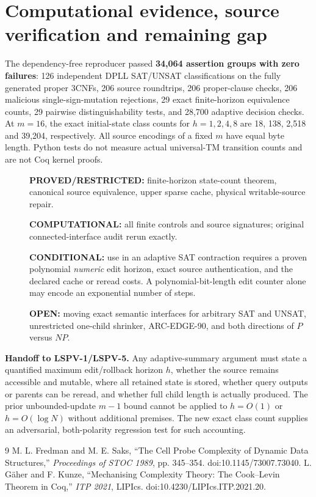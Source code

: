\documentclass[11pt]{article}
\begin{document}
\section{Computational evidence, source verification and remaining gap}
The dependency-free reproducer passed \textbf{34,064 assertion groups with zero failures}: 126 independent DPLL SAT/UNSAT classifications on the fully generated proper 3CNFs, 206 source roundtrips, 206 proper-clause checks, 206 malicious single-sign-mutation rejections, 29 exact finite-horizon equivalence counts, 29 pairwise distinguishability tests, and 28,700 adaptive decision checks. At $m=16$, the exact initial-state class counts for $h=1,2,4,8$ are 18, 138, 2,518 and 39,204, respectively. All source encodings of a fixed $m$ have equal byte length. Python tests do not measure actual universal-TM transition counts and are not Coq kernel proofs.

\begin{description}
\item[]\textbf{PROVED/RESTRICTED:} finite-horizon state-count theorem, canonical source equivalence, upper sparse cache, physical writable-source repair.
\item[]\textbf{COMPUTATIONAL:} all finite controls and source signatures; original connected-interface audit rerun exactly.
\item[]\textbf{CONDITIONAL:} use in an adaptive SAT contraction requires a proven polynomial \emph{numeric} edit horizon, exact source authentication, and the declared cache or reread costs. A polynomial-bit-length edit counter alone may encode an exponential number of steps.
\item[]\textbf{OPEN:} moving exact semantic interfaces for arbitrary SAT and UNSAT, unrestricted one-child shrinker, ARC-EDGE-90, and both directions of $P$ versus $NP$.
\end{description}
\noindent\textbf{Handoff to LSPV-1/LSPV-5.} Any adaptive-summary argument must state a quantified maximum edit/rollback horizon $h$, whether the source remains accessible and mutable, where all retained state is stored, whether query outputs or parents can be reread, and whether full child length is actually produced. The prior unbounded-update $m-1$ bound cannot be applied to $h=O(1)$ or $h=O(\log N)$ without additional premises. The new exact class count supplies an adversarial, both-polarity regression test for such accounting.

\begin{thebibliography}{9}
 M. L. Fredman and M. E. Saks, ``The Cell Probe Complexity of Dynamic Data Structures,'' \emph{Proceedings of STOC 1989}, pp. 345--354. doi:10.1145/73007.73040.
 L. G\"aher and F. Kunze, ``Mechanising Complexity Theory: The Cook--Levin Theorem in Coq,'' \emph{ITP 2021}, LIPIcs. doi:10.4230/LIPIcs.ITP.2021.20.
\end{thebibliography}
\end{document}
